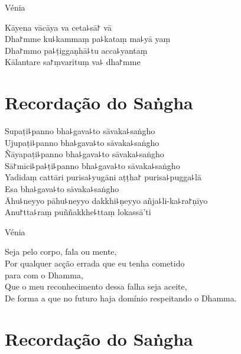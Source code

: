 \clearpage

\begin{instruction}
  Vénia
\end{instruction}

Kāyena vācāya va ceta꜕sā꜓ vā\\
Dha꜓mme ku꜕kammaṃ pa꜕kataṃ ma꜕yā yaṃ\\
Dha꜓mmo pa꜕ṭiggaṇhā꜕tu acca꜕yantaṃ\\
Kālantare sa꜓ṃvarituṃ va꜕ dha꜓mme

\chapter*{Recordação do Saṅgha}

\delegateSetUseNext

\begin{leader}
\end{leader}

Supaṭi꜕panno bha꜕gava꜕to sāvaka꜕saṅgho\\
Ujupaṭi꜕panno bha꜕gava꜕to sāvaka꜕saṅgho\\
Ñāyapaṭi꜕panno bha꜕gava꜕to sāvaka꜕saṅgho\\
Sā꜓mīci꜕pa꜕ṭi꜕panno bha꜕gava꜕to sāvaka꜕saṅgho\\
Yadidaṃ cattāri purisa꜕yugāni aṭṭha꜓ purisa꜕pugga꜕lā\\
Esa bha꜕gava꜕to sāvaka꜕saṅgho\\
Āhu꜕neyyo pāhu꜕neyyo dakkhi꜕ṇeyyo añja꜕li-ka꜕ra꜓ṇīyo\\
Anu꜓tta꜕raṃ puññakkhe꜕ttaṃ lokassā'ti

\clearpage

\begin{instruction}
  Vénia
\end{instruction}

Seja pelo corpo, fala ou mente,\\
Por qualquer acção errada que eu tenha cometido\\
\vin para com o Dhamma,\\
Que o meu reconhecimento dessa falha seja aceite,\\
De forma a que no futuro haja domínio respeitando o Dhamma.

\chapter{Recordação do Saṅgha}

\begin{leader}
\end{leader}

